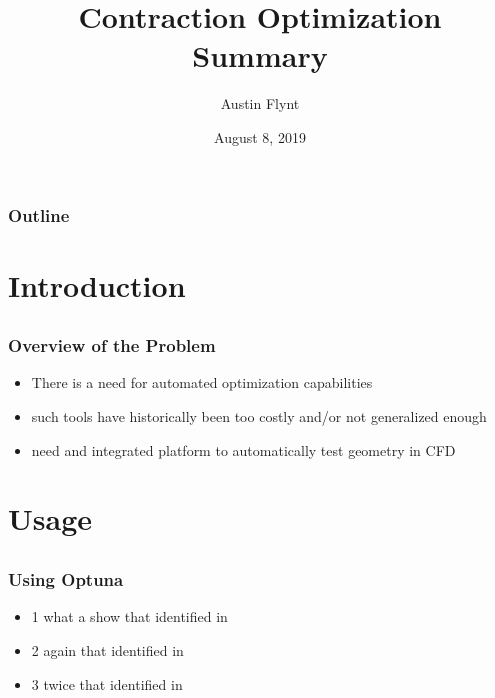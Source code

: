\documentclass[ignorenonframetext,]{beamer}
\title{Contraction Optimization Summary}
\author{Austin Flynt}
\date{August 8, 2019}
\begin{document}
\begin{frame}
  \titlepage
\end{frame}


\begin{frame}
  \frametitle{Outline}
  \tableofcontents
\end{frame}

\section{Introduction}\label{intro}
\subsection{}
\begin{frame}[t]
  \frametitle{Overview of the Problem}
  \begin{itemize}
    \itemsep1pt\parskip0pt
    \item There is a need for automated optimization capabilities
    \item such tools have historically been too \alert{costly} and/or not
          generalized enough
    \item need and integrated platform to automatically test geometry in CFD
  \end{itemize}
\end{frame}

\section{Usage}\label{usage}
\subsection{}
\begin{frame}[t]
  \frametitle{Using Optuna}
  \begin{itemize}
    \itemsep1pt\parskip0pt
    \item 1 what a show that identified in
    \item 2 again that identified in
    \item 3 twice that identified in
  \end{itemize}
\end{frame}
\end{document}
